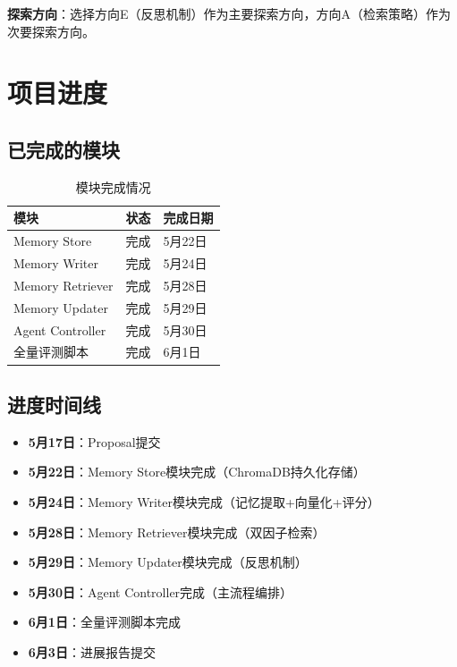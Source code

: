 \documentclass[11pt]{article}
\begin{document}
\textbf{探索方向}：选择方向E（反思机制）作为主要探索方向，方向A（检索策略）作为次要探索方向。

\section{项目进度}

\subsection{已完成的模块}

\begin{table}[H]
    \centering
    \begin{tabular}{|l|l|l|}
        \hline
        模块 & 状态 & 完成日期 \\
        \hline
        Memory Store & 完成 & 5月22日 \\
        \hline
        Memory Writer & 完成 & 5月24日 \\
        \hline
        Memory Retriever & 完成 & 5月28日 \\
        \hline
        Memory Updater & 完成 & 5月29日 \\
        \hline
        Agent Controller & 完成 & 5月30日 \\
        \hline
        全量评测脚本 & 完成 & 6月1日 \\
        \hline
    \end{tabular}
    \caption{模块完成情况}
\end{table}

\subsection{进度时间线}

\begin{itemize}
    \item \textbf{5月17日}：Proposal提交
    \item \textbf{5月22日}：Memory Store模块完成（ChromaDB持久化存储）
    \item \textbf{5月24日}：Memory Writer模块完成（记忆提取+向量化+评分）
    \item \textbf{5月28日}：Memory Retriever模块完成（双因子检索）
    \item \textbf{5月29日}：Memory Updater模块完成（反思机制）
    \item \textbf{5月30日}：Agent Controller完成（主流程编排）
    \item \textbf{6月1日}：全量评测脚本完成
    \item \textbf{6月3日}：进展报告提交
\end{itemize}
\end{document}
